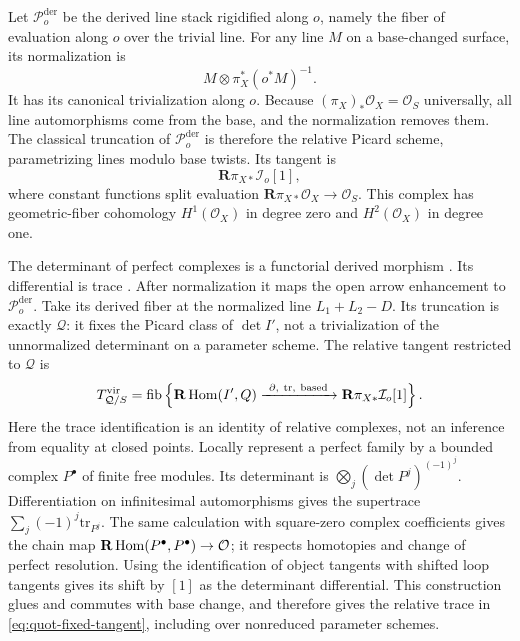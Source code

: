 Let \(\mathcal P_o^{\mathrm{der}}\) be the derived line stack
rigidified along \(o\), namely the fiber of evaluation along \(o\) over
the trivial line. For any line \(M\) on a base-changed surface, its
normalization is
\[
 M\otimes\pi_X^*(o^*M)^{-1}.
\]
It has its canonical trivialization along \(o\).
Because \((\pi_X)_*\mathcal O_X=\mathcal O_S\) universally, all
line automorphisms come from the base, and the normalization removes
them. The classical truncation of \(\mathcal P_o^{\mathrm{der}}\) is
therefore the relative Picard scheme, parametrizing lines modulo base
twists. Its tangent is
\begin{equation}
\label{eq:based-picard-tangent}
 \mathbf R\pi_{X*}\mathcal I_o[1],
\end{equation}
where constant functions split evaluation
\(\mathbf R\pi_{X*}\mathcal O_X\to\mathcal O_S\).
This complex has geometric-fiber cohomology \(H^1(\mathcal O_X)\)
in degree zero and \(H^2(\mathcal O_X)\) in degree one.

The determinant of perfect complexes is a functorial derived morphism
\cite[Section 3.1]{STV}. Its differential is trace
\cite[Proposition 3.2]{STV}. After normalization it maps the open
arrow enhancement to \(\mathcal P_o^{\mathrm{der}}\).
Take its derived fiber at the normalized line \(L_1+L_2-D\).
Its truncation is exactly \(\mathcal Q\): it fixes the Picard class
of \(\det I'\), not a trivialization of the unnormalized determinant
on a parameter scheme. The relative tangent restricted to \(\mathcal Q\)
is
\begin{equation}
\label{eq:quot-fixed-tangent}
 T_{\mathcal Q/S}^{\mathrm{vir}}=
 \operatorname{fib}\left\{
 \mathbf R\operatorname{Hom}(I',Q)
 \xrightarrow{\ \partial,\ \mathrm{tr},\ \mathrm{based}\ }
 \mathbf R\pi_{X*}\mathcal I_o[1]\right\}.
\end{equation}
Here the trace identification is an identity of relative complexes,
not an inference from equality at closed points.
Locally represent a perfect family by a bounded complex \(P^\bullet\)
of finite free modules. Its determinant is
\(\bigotimes_j(\det P^j)^{(-1)^j}\).
Differentiation on infinitesimal automorphisms gives the supertrace
\(\sum_j(-1)^j\mathrm{tr}_{P^j}\).
The same calculation with square-zero complex coefficients gives
the chain map \(\mathbf R\operatorname{Hom}(P^\bullet,P^\bullet)\to\mathcal O\);
it respects homotopies and change of perfect resolution.
Using the identification of object tangents with shifted loop
tangents gives its shift by \([1]\) as the determinant differential.
This construction glues and commutes with base change, and therefore
gives the relative trace in \eqref{eq:quot-fixed-tangent}, including
over nonreduced parameter schemes.

